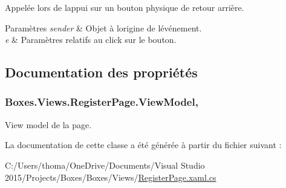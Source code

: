 Appelée lors de l\textquotesingle{}appui sur un bouton physique de retour arrière. 


\begin{DoxyParams}{Paramètres}
{\em sender} & Objet à l\textquotesingle{}origine de l\textquotesingle{}événement. \\
\hline
{\em e} & Paramètres relatifs au click sur le bouton. \\
\hline
\end{DoxyParams}


\subsection{Documentation des propriétés}
\subsubsection[{\texorpdfstring{View\+Model}{ViewModel}}]{ Boxes.\+Views.\+Register\+Page.\+View\+Model\hspace{0.3cm}{\ttfamily [get]}, {\ttfamily [private]}}\hypertarget{class_boxes_1_1_views_1_1_register_page_a90c139d73e9a2abc8ff1909299fce2b1}{}\label{class_boxes_1_1_views_1_1_register_page_a90c139d73e9a2abc8ff1909299fce2b1}


View model de la page. 



La documentation de cette classe a été générée à partir du fichier suivant \+:\begin{DoxyCompactItemize}
\item 
C\+:/\+Users/thoma/\+One\+Drive/\+Documents/\+Visual Studio 2015/\+Projects/\+Boxes/\+Boxes/\+Views/\hyperlink{_register_page_8xaml_8cs}{Register\+Page.\+xaml.\+cs}\end{DoxyCompactItemize}
